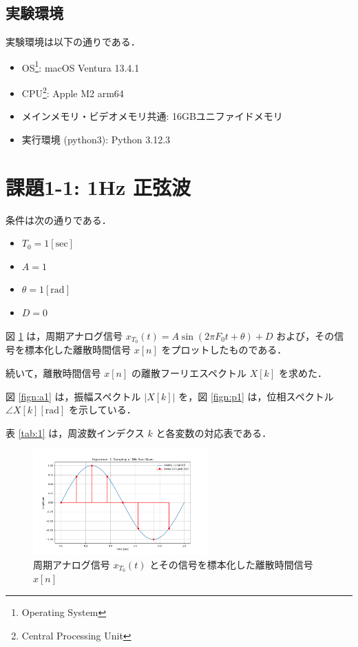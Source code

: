 \documentclass[fleqn, a4paper. 12pt]{jsarticle}
\begin{document}
  \subsection*{実験環境}

    実験環境は以下の通りである．

    \begin{itemize}
      \item OS\footnote{Operating System}: macOS Ventura 13.4.1
      \item CPU\footnote{Central Processing Unit}: Apple M2 arm64\footnotemark[4]
      \item メインメモリ・ビデオメモリ共通: 16GBユニファイドメモリ\footnotemark[4]
      \item 実行環境 (python3): Python 3.12.3
    \end{itemize}

  \newpage
  \section*{課題1-1: 1Hz 正弦波}

    条件は次の通りである．

    \begin{itemize}
      \item $T_0 = 1 [\mathrm{sec}]$
      \item $A = 1$
      \item $\theta = 1 [\mathrm{rad}]$
      \item $D = 0$
    \end{itemize}

    図 \ref{fig:s1} は，周期アナログ信号 $x_{T_0}(t)=A \sin \left(2 \pi F_0 t+\theta\right)+D$ および，その信号を標本化した離散時間信号 $x[n]$ をプロットしたものである．
    
    続いて，離散時間信号 $x[n]$ の離散フーリエスペクトル $X[k]$ を求めた．
    
    図 \ref{fign:a1} は，振幅スペクトル $|X[k]|$ を，図 \ref{fign:p1} は，位相スペクトル $\angle X[k][\mathrm{rad}]$ を示している．

    表 \ref{tab:1} は，周波数インデクス $k$ と各変数の対応表である．

    \begin{figure}[!h]
      \centering
      \includegraphics[width=0.6\textwidth]{sampling_experiment_1.png}
      \caption{周期アナログ信号 $x_{T_0}(t)$ とその信号を標本化した離散時間信号 $x[n]$}
      \label{fig:s1}
    \end{figure}
\end{document}
